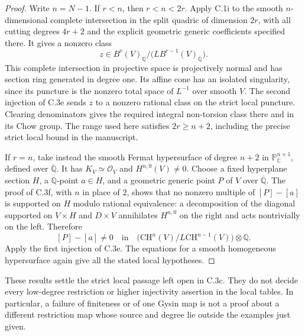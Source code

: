 \begin{proof}
Write $n=N-1$. If $r<n$, then $r<n<2r$.
Apply C.1i to the smooth $n$-dimensional complete intersection in
the split quadric of dimension $2r$, with all cutting degrees
$4r+2$ and the explicit geometric generic coefficients specified
there. It gives a nonzero class
\[
 z\in B^r(V)_{\mathbb Q}/
                         \bigl(LB^{r-1}(V)_{\mathbb Q}\bigr).
\]
This complete intersection in projective space is projectively
normal and has section ring generated in degree one. Its affine
cone has an isolated singularity, since its puncture is the
nonzero total space of $L^{-1}$ over smooth $V$.
The second injection of C.3e sends $z$ to a nonzero rational
class on the strict local puncture. Clearing denominators gives
the required integral non-torsion class there and in its Chow group.
The range used here satisfies $2r\ge n+2$, including the precise
strict local bound in the manuscript.

If $r=n$, take instead the smooth Fermat hypersurface of degree
$n+2$ in $\mathbb P^{n+1}_{\mathbb C}$, defined over
$\overline{\mathbb Q}$. It has $K_V\simeq\mathcal O_V$ and
$H^{n,0}(V)\ne0$. Choose a fixed hyperplane section $H$, a
$\overline{\mathbb Q}$-point $a\in H$, and a geometric generic
point $P$ of $V$ over $\overline{\mathbb Q}$.
The proof of C.3f, with $n$ in place of $2$, shows that no nonzero
multiple of $[P]-[a]$ is supported on $H$ modulo rational
equivalence: a decomposition of the diagonal supported on
$V\times H$ and $D\times V$ annihilates $H^{n,0}$ on the right
and acts nontrivially on the left. Therefore
\[
 [P]-[a]\ne0\quad\text{in}\quad
 \bigl(\mathrm{CH}^n(V)/L\mathrm{CH}^{n-1}(V)\bigr)
                                      \otimes\mathbb Q.
\]
Apply the first injection of C.3e. The equations for a smooth
homogeneous hypersurface again give all the stated local hypotheses.
\end{proof}

These results settle the strict local passage left open in C.3c.
They do not decide every low-degree restriction or higher injectivity
assertion in the local tables. In particular, a failure of finiteness
or of one Gysin map is not a proof about a different restriction map
whose source and degree lie outside the examples just given.
